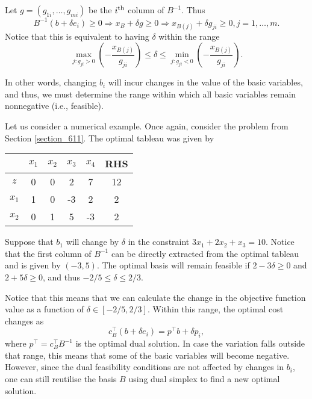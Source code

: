 Let $g = (g_{1i}, \dots, g_{mi})$ be the $i^\text{th}$ column of $B^{-1}$. Thus
%
\begin{equation*}
	B^{-1}(b + \delta e_i) \geq 0 \Rightarrow x_B + \delta g \geq 0 \Rightarrow x_{B(j)} + \delta g_{ji} \geq 0, j = 1,\dots, m.  
\end{equation*}
%
Notice that this is equivalent to having $\delta$ within the range
%
\begin{equation*}
	\max_{j : g_{ji} > 0}\left(-\frac{x_{B(j)}}{g_{ji}}\right) \leq \delta \leq \min_{j : g_{ji} < 0}\left(-\frac{x_{B(j)}}{g_{ji}}\right).	
\end{equation*}

In other words, changing $b_i$ will incur changes in the value of the basic variables, and thus, we must determine the range within which all basic variables remain nonnegative (i.e., feasible).

Let us consider a numerical example. Once again, consider the problem from Section \ref{section_611}. The optimal tableau was given by

\begin{center}
	\begin{tabular}{c|cccc|c} 
	   &$x_1$ & $x_2$ & $x_3$ & $x_4$& RHS \\ \hline	
	   $z$ & 0 & 0 & 2 & 7 & 12\\
	   $x_1$ & 1 & 0 & -3 & 2 & 2\\
	   $x_2$ & 0 & 1 & 5 & -3 & 2\\	            
	\end{tabular}	
\end{center}

Suppose that $b_1$ will change by $\delta$ in the constraint $3x_1 + 2x_2 + x_3  = 10$. Notice that the first column of $B^{-1}$ can be directly extracted from the optimal tableau and is given by $(-3,5)$. The optimal basis will remain feasible if $2 - 3\delta \geq 0$ and $2 + 5\delta \geq 0$, and thus $-2/5 \leq \delta \leq 2/3$.

Notice that this means that we can calculate the change in the objective function value as a function of $\delta \in [-2/5, 2/3]$. Within this range, the optimal cost changes as 
%
\begin{equation*}
	c_B^\top (b + \delta e_i) = p^\top b + \delta p_i,	
\end{equation*}
%
where $p^\top = c_B ^\top B^{-1}$ is the optimal dual solution. In case the variation falls outside that range, this means that some of the basic variables will become negative. However, since the dual feasibility conditions are not affected by changes in $b_i$, one can still reutilise the basis $B$ using dual simplex to find a new optimal solution.


